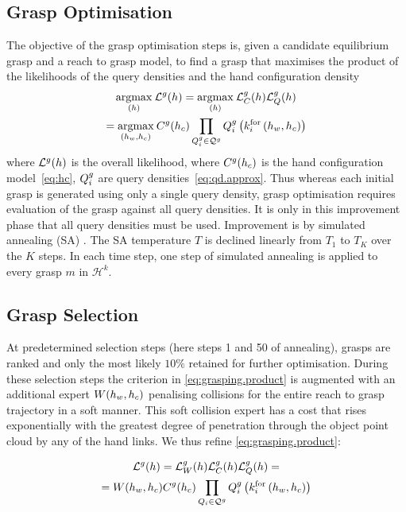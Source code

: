 \subsection{Grasp Optimisation}
The objective of the grasp optimisation steps is, given a candidate equilibrium grasp and a reach to grasp model, to find a grasp that maximises the product of the likelihoods of the query densities and the hand configuration density
\begin{multline}
\underset{(h)}{\operatorname{argmax}}\medspace  \mathcal{L}^g(h) = \underset{(h)}{\operatorname{argmax}}\medspace  \mathcal{L}^g_C(h) \mathcal{L}^g_Q(h) \\
 = \underset{(h_w, h_c)}{\operatorname{argmax}}\medspace   C^{g}(h_c) \prod_{Q_i^g \in \mathcal{Q}^g} Q_i^g\left(k_{i}^{\mathrm{for}}\left(h_w, h_c\right)\right)
\label{eq:grasping.product}
\end{multline}
where ${\cal L}^g(h)$ is the overall likelihood, where $C^g(h_c)$ is the hand configuration model~\eqref{eq:hc}, $Q_i^g$ are query densities~\eqref{eq:qd.approx}. Thus whereas each initial grasp is generated using only a single query density, grasp optimisation requires evaluation of the grasp against all query densities. It is only in this improvement phase that all query densities must be used. Improvement is by simulated annealing (SA) \cite{kirkpatrick83optimizationby}. The SA temperature $T$ is declined linearly from $T_{1}$ to $T_{K}$ over the $K$ steps. In each time step, one step of simulated annealing is applied to every grasp $m$ in $\mathcal{H}^k$.
 
 \subsection{Grasp Selection}
At predetermined selection steps (here steps 1 and 50 of annealing), grasps are ranked and only the most likely $10\%$ retained for further optimisation. During these selection steps the criterion in \eqref{eq:grasping.product} is augmented with an additional expert $W(h_w, h_c)$ penalising collisions for the entire reach to grasp trajectory in a soft manner. This soft collision expert has a cost that rises exponentially with the greatest degree of penetration through the object point cloud by any of the hand links. We thus refine \eq\ref{eq:grasping.product}:

\begin{multline}\label{eq:grasping.likelihood}
{\cal L}^g(h) = {\cal L}^g_\coll(h) {\cal L}^g_\hc(h) {\cal L}^g_\qd(h) = \\
= \coll(h_w, h_c) \hc^g(h_c) \prod_{\qd_i \in \mathcal{Q}^{g}} \qd^g_i\left(k_{i}^{\mathrm{for}}\left(h_w, h_c\right)\right)
\end{multline}

